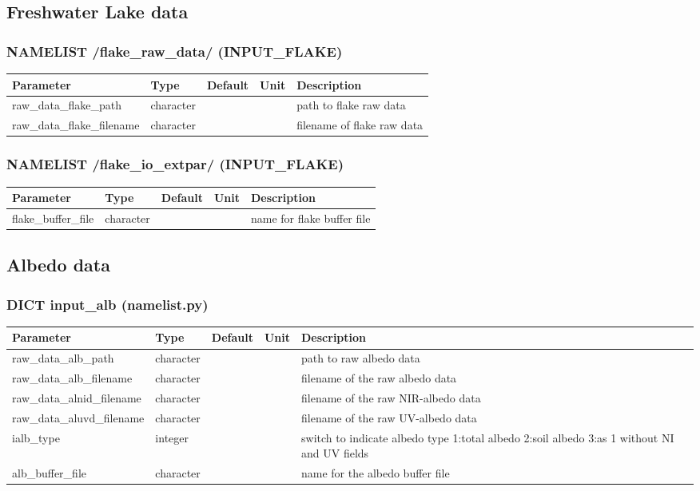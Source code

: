 \documentclass[a4paper,10pt,DIV14,BCOR1cm,titlepage,twoside]{scrartcl}
\providecommand{\tabularnewline}{\\}
\begin{document}
\subsection{Freshwater Lake data}\label{namelist_input_for_extpar_flake}

\subsubsection*{NAMELIST /flake\_raw\_data/ (INPUT\_FLAKE)}

\begin{longtable}{|p{4cm}|p{1.5cm}|p{1.5cm}|p{1cm}|p{6cm}|}
\hline 
\textbf{Parameter}& \textbf{Type}& \textbf{Default}& \textbf{Unit}& \textbf{Description}
\tabularnewline
\hline
\endhead
\hline 
raw\_data\_flake\_path & character & &  & path to flake raw data \tabularnewline
\hline 
raw\_data\_flake\_filename & character & &  & filename of flake raw data \tabularnewline
\hline
\bottomrule
\end{longtable}

\subsubsection*{NAMELIST /flake\_io\_extpar/ (INPUT\_FLAKE)}
\begin{longtable}{|p{4cm}|p{1.5cm}|p{1.5cm}|p{1cm}|p{6cm}|}
\hline 
\textbf{Parameter}& \textbf{Type}& \textbf{Default}& \textbf{Unit}& \textbf{Description}
\tabularnewline
\hline
\endhead
\hline
flake\_buffer\_file & character & &  & name for flake buffer file
\tabularnewline
\bottomrule
\end{longtable}

\subsection{Albedo data}\label{namelist_input_for_extpar_albedo}

\subsubsection*{DICT input\_alb (namelist.py)}

\begin{longtable}{|p{4cm}|p{1.5cm}|p{1.5cm}|p{1cm}|p{6cm}|}
\hline 
\textbf{Parameter}& \textbf{Type}& \textbf{Default}& \textbf{Unit}& \textbf{Description}
\tabularnewline
\hline
\endhead
\hline 
raw\_data\_alb\_path & character & & & path to raw albedo data
\tabularnewline
\hline
raw\_data\_alb\_filename & character & & & filename of the raw albedo data
\tabularnewline
\hline
raw\_data\_alnid\_filename & character & & & filename of the raw NIR-albedo data
\tabularnewline
\hline
raw\_data\_aluvd\_filename & character & & & filename of the raw UV-albedo data
\tabularnewline
\hline
ialb\_type & integer &  & & switch to indicate albedo type 1:total albedo 2:soil albedo 3:as 1 without NI and UV fields
\tabularnewline
\hline
alb\_buffer\_file & character & & & name for the albedo buffer file
\tabularnewline
\bottomrule
\end{longtable}
\end{document}
